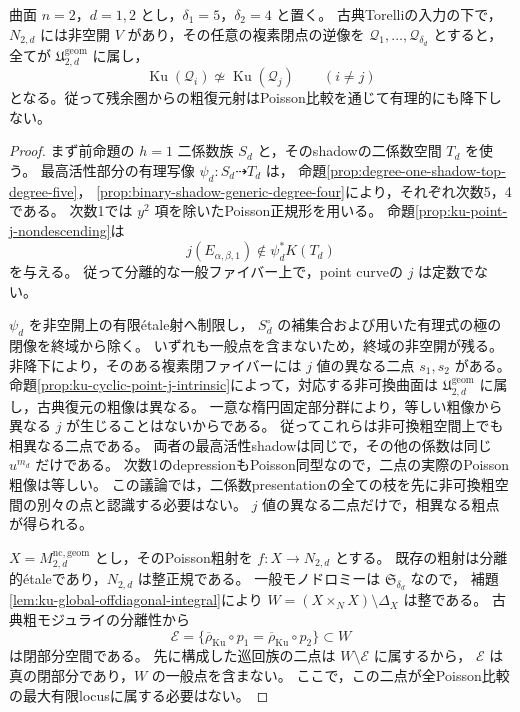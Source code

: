 \begin{theorem}[一般Poissonファイバーの残余圏は全て相互に非同値]
\label{thm:ku-generic-poisson-fibres-separated}
曲面 $n=2$，$d=1,2$ とし，$\delta_1=5$，$\delta_2=4$ と置く。
古典Torelliの入力\cite[定理1.2]{LinRampazzoZhang2026}の下で，
$N_{2,d}$ には非空開 $V$ があり，その任意の複素閉点の逆像を
$\mathcal Q_1,\ldots,\mathcal Q_{\delta_d}$ とすると，
全てが $\mathfrak U^{\mathrm{geom}}_{2,d}$ に属し，
\[
 \operatorname{Ku}(\mathcal Q_i)\not\simeq
 \operatorname{Ku}(\mathcal Q_j)\qquad(i\ne j)
\]
となる。従って残余圏からの粗復元射はPoisson比較を通じて有理的にも降下しない。
\end{theorem}
\begin{proof}
まず前命題の $h=1$ 二係数族 $S_d$ と，そのshadowの二係数空間 $T_d$ を使う。
最高活性部分の有理写像 $\psi_d:S_d\dashrightarrow T_d$ は，
命題\ref{prop:degree-one-shadow-top-degree-five}，
\ref{prop:binary-shadow-generic-degree-four}により，それぞれ次数5，4である。
次数1では $y^2$ 項を除いたPoisson正規形を用いる。
命題\ref{prop:ku-point-j-nondescending}は
\[
 j(E_{\alpha,\beta,1})\notin\psi_d^*K(T_d)
\]
を与える。
従って分離的な一般ファイバー上で，point curveの $j$ は定数でない。

$\psi_d$ を非空開上の有限\'{e}tale射へ制限し，
$S_d^\circ$ の補集合および用いた有理式の極の閉像を終域から除く。
いずれも一般点を含まないため，終域の非空開が残る。
非降下により，そのある複素閉ファイバーには $j$ 値の異なる二点 $s_1,s_2$ がある。
命題\ref{prop:ku-cyclic-point-j-intrinsic}によって，対応する非可換曲面は
$\mathfrak U^{\mathrm{geom}}_{2,d}$ に属し，古典復元の粗像は異なる。
一意な楕円固定部分群により，等しい粗像から異なる $j$ が生じることはないからである。
従ってこれらは非可換粗空間上でも相異なる二点である。
両者の最高活性shadowは同じで，その他の係数は同じ $u^{m_d}$ だけである。
次数1のdepressionもPoisson同型なので，二点の実際のPoisson粗像は等しい。
この議論では，二係数presentationの全ての枝を先に非可換粗空間の別々の点と認識する必要はない。
$j$ 値の異なる二点だけで，相異なる粗点が得られる。

$X=M^{\mathrm{nc,geom}}_{2,d}$ とし，そのPoisson粗射を $f:X\to N_{2,d}$ とする。
既存の粗射は分離的\'{e}taleであり，$N_{2,d}$ は整正規である。
一般モノドロミーは $\mathfrak S_{\delta_d}$ なので，
補題\ref{lem:ku-global-offdiagonal-integral}により
$W=(X\times_NX)\setminus\Delta_X$ は整である。
古典粗モジュライの分離性から
\[
 \mathcal E=
 \{\overline\rho_{\mathrm{Ku}}\circ p_1
      =\overline\rho_{\mathrm{Ku}}\circ p_2\}\subset W
\]
は閉部分空間である。
先に構成した巡回族の二点は $W\setminus\mathcal E$ に属するから，
$\mathcal E$ は真の閉部分であり，$W$ の一般点を含まない。
ここで，この二点が全Poisson比較の最大有限locusに属する必要はない。


\end{proof}
